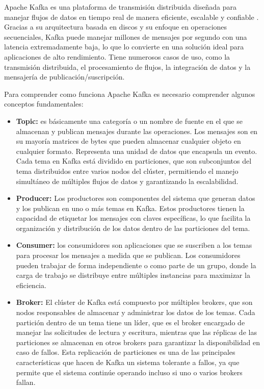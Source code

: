 \documentclass{article}
\begin{document}
Apache Kafka es una plataforma de transmisión distribuida diseñada para manejar flujos de datos en tiempo real de manera eficiente, escalable y confiable \cite{KafkaDocumentation}. Gracias a su arquitectura basada en discos y su enfoque en operaciones secuenciales, Kafka puede manejar millones de mensajes por segundo con una latencia extremadamente baja, lo que lo convierte en una solución ideal para aplicaciones de alto rendimiento.
Tiene numerosos casos de uso, como la transmisión distribuida, el procesamiento de flujos, la integración de datos y la mensajería de publicación/suscripción.

Para comprender como funciona Apache Kafka es necesario comprender algunos conceptos fundamentales:

\begin{itemize}
    \item \textbf{Topic: }es básicamente una categoría o un nombre de fuente en el que se almacenan y publican mensajes durante las operaciones. Los mensajes son en su mayoría matrices de bytes que pueden almacenar cualquier objeto en cualquier formato. Representa una unidad de datos que encapsula un evento. Cada tema en Kafka está dividido en particiones, que son subconjuntos del tema distribuidos entre varios nodos del clúster, permitiendo el manejo simultáneo de múltiples flujos de datos y garantizando la escalabilidad.
    \item \textbf{Producer: }Los productores son componentes del sistema que generan datos y los publican en uno o más temas en Kafka. Estos productores tienen la capacidad de etiquetar los mensajes con claves específicas, lo que facilita la organización y distribución de los datos dentro de las particiones del tema.
    \item \textbf{Consumer: } los consumidores son aplicaciones que se suscriben a los temas para procesar los mensajes a medida que se publican. Los consumidores pueden trabajar de forma independiente o como parte de un grupo, donde la carga de trabajo se distribuye entre múltiples instancias para maximizar la eficiencia.
    \item \textbf{Broker: }El clúster de Kafka está compuesto por múltiples brokers, que son nodos responsables de almacenar y administrar los datos de los temas. Cada partición dentro de un tema tiene un líder, que es el broker encargado de manejar las solicitudes de lectura y escritura, mientras que las réplicas de las particiones se almacenan en otros brokers para garantizar la disponibilidad en caso de fallos. Esta replicación de particiones es una de las principales características que hacen de Kafka un sistema tolerante a fallos, ya que permite que el sistema continúe operando incluso si uno o varios brokers fallan.

\end{itemize}
\end{document}
